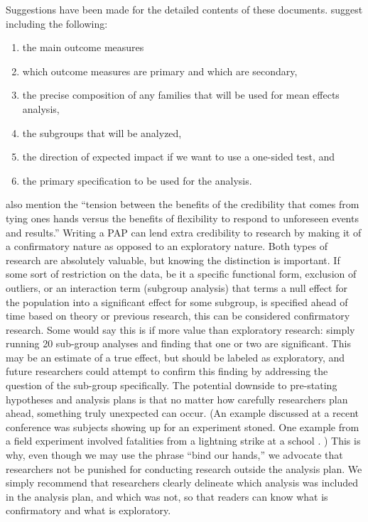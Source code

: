 \documentclass[12pt] {article}
\begin{document}
Suggestions have been made for the detailed contents of these documents.
\cite{glennerster_running_2013} suggest including the following:

\begin{enumerate}
\def\labelenumi{\arabic{enumi}.}
\item
  the main outcome measures
\item
  which outcome measures are primary and which are secondary,
\item
  the precise composition of any families that will be used for mean
  effects analysis,
\item
  the subgroups that will be analyzed,
\item
  the direction of expected impact if we want to use a one-sided test,
  and
\item
  the primary specification to be used for the analysis.
\end{enumerate}

\cite{glennerster_running_2013} also mention the ``tension between
the benefits of the credibility that comes from tying ones hands versus
the benefits of flexibility to respond to unforeseen events and
results.'' Writing a PAP can lend extra credibility to research by making it of a confirmatory nature as opposed to an exploratory nature.
Both types of research are absolutely valuable, but knowing the distinction is important. If some sort of restriction on the data, be it a specific functional form, exclusion of outliers, or an interaction term (subgroup analysis) that terms a null effect for the population into a significant effect for some subgroup, is specified ahead of time based on theory or previous research, this can be considered confirmatory research. Some would say this is if more value than exploratory research: simply running 20 sub-group analyses and finding that one or two are significant. This may be an estimate of a true effect, but should be labeled as exploratory, and future researchers could attempt to confirm this finding by addressing the question of the sub-group specifically. The potential downside to pre-stating hypotheses and analysis plans is that no matter how carefully researchers plan ahead, something truly unexpected can occur. (An example discussed at a recent conference was subjects showing up for an experiment stoned. One example from a field experiment involved fatalities from a lightning strike at a school \citep{kremer2009incentives}. ) This is why, even though we may use the phrase ``bind our hands,'' we advocate that researchers not be punished for conducting research outside the analysis plan. We simply recommend that researchers clearly delineate which analysis was included in the analysis plan, and which was not, so that readers can know what is confirmatory and what is exploratory.
\end{document}
